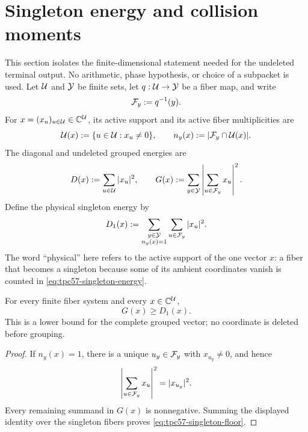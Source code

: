 \section{Singleton energy and collision moments}
\label{sec:tpc57-singleton-theory}

This section isolates the finite-dimensional statement needed for the
undeleted terminal output.  No arithmetic, phase hypothesis, or choice of a
subpacket is used.  Let \(\mathcal U\) and \(\mathcal Y\) be finite sets, let
\(q:\mathcal U\to\mathcal Y\) be a fiber map, and write
\begin{equation}
 \mathcal F_y:=q^{-1}(y).
 \label{eq:tpc57-abstract-fiber}
\end{equation}
For \(x=(x_u)_{u\in\mathcal U}\in\mathbb C^{\mathcal U}\), its active support and its active
fiber multiplicities are
\begin{equation}
 \mathcal U(x):=\{u\in\mathcal U:x_u\ne0\},
 \qquad
 n_y(x):=|\mathcal F_y\cap\mathcal U(x)|.
 \label{eq:tpc57-active-multiplicity}
\end{equation}
The diagonal and undeleted grouped energies are
\begin{equation}
 D(x):=\sum_{u\in\mathcal U}|x_u|^2,
 \qquad
 G(x):=\sum_{y\in\mathcal Y}
       \left|\sum_{u\in\mathcal F_y}x_u\right|^2.
 \label{eq:tpc57-diagonal-grouped-energies}
\end{equation}
Define the physical singleton energy by
\begin{equation}
 D_1(x):=
 \sum_{\substack{y\in\mathcal Y\\n_y(x)=1}}
 \sum_{u\in\mathcal F_y}|x_u|^2.
 \label{eq:tpc57-singleton-energy}
\end{equation}
The word ``physical'' here refers to the active support of the one vector
\(x\): a fiber that becomes a singleton because some of its ambient
coordinates vanish is counted in \eqref{eq:tpc57-singleton-energy}.

\begin{theorem}
\label{thm:tpc57-singleton-floor}
For every finite fiber system and every \(x\in\mathbb C^{\mathcal U}\),
\begin{equation}
 \boxed{G(x)\ge D_1(x).}
 \label{eq:tpc57-singleton-floor}
\end{equation}
This is a lower bound for the complete grouped vector; no coordinate is
deleted before grouping.
\end{theorem}

\begin{proof}
If \(n_y(x)=1\), there is a unique \(u_y\in\mathcal F_y\) with
\(x_{u_y}\ne0\), and hence
\[
 \left|\sum_{u\in\mathcal F_y}x_u\right|^2=|x_{u_y}|^2.
\]
Every remaining summand in \(G(x)\) is nonnegative.  Summing the displayed
identity over the singleton fibers proves
\eqref{eq:tpc57-singleton-floor}.
\end{proof}

